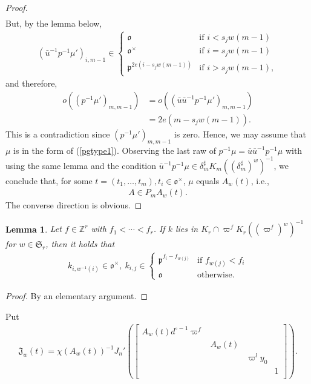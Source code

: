 \documentclass[11pt]{amsart}
\newcommand\Vp{\varpi}%
\newcommand\vp{\varphi}%
\newcommand\oo{\mathfrak{o}}
\newcommand\Sf{{\mathfrak{S}}}
\newcommand\Jf{\mathfrak{J}}
\newcommand\p{{\mathfrak{p}}}
\newcommand\Z{{\mathbb{Z}}}
\newcommand\1{\mathbf{1}}
\newcommand\nid{\noindent}
\newcommand\tm{\times}
\newcommand\bu{\bar{u}}
\numberwithin{equation}{section}
\newtheorem{lem}[thm]{Lemma}
\begin{document}
\begin{proof}
\begin{align*}
\end{align*}
But, by the lemma below, 
\begin{align*}
(\bu^{-1}  p^{-1} \mu')_{i,m-1} 
\in \begin{cases}
\oo & \mbox{if $i < s_jw(m-1)$} \\
\oo^\tm  & \mbox{if $i = s_jw(m-1)$} \\
\p^{2e(i- s_jw(m-1))} & \mbox{if $i > s_jw(m-1)$},
\end{cases}
\end{align*} 
and therefore, 
\begin{align*}
o((p^{-1} \mu')_{m,m-1}) &= o((\bu \bu^{-1} p^{-1} \mu')_{m, m-1})\\
 &= 2e(m- s_j w(m-1)).
\end{align*}
This is a contradiction since $(p^{-1} \mu')_{m,m-1}$ is zero.
Hence, we may assume that $\mu$ is in the form of (\ref{pgtype1}).
Observing the last raw of $p^{-1} \mu = \bu \bu^{-1} p^{-1} \mu$ with using the same lemma and the condition $\bu^{-1} p^{-1} \mu \in \delta_m^\sharp K_m ((\delta_m^\sharp)^{w})^{-1}$, we conclude that, for some $t = (t_1, \ldots, t_m), t_i \in \oo^\tm$, $\mu$ equals $A_w(t)$, i.e., 
\begin{align*}
 A \in P_mA_w(t).
 \end{align*}
The converse direction is obvious. 
\end{proof}
\begin{lem}
Let $f \in \Z^r$ with $f_1 < \cdots < f_r$.
If $k$ lies in $K_r \cap \Vp^f K_r ((\Vp^f)^w)^{-1}$ for $w \in \Sf_r$, then it holds that
\begin{align*}
k_{i,w^{-1}(i)} \in \oo^\tm, \ 
k_{i,j} \in \begin{cases}
\p^{f_i - f_{w(j)}} & \mbox{if $f_{w(j)} < f_i$} \\
\oo & \mbox{otherwise}. 
\end{cases}
\end{align*}
\end{lem}
\begin{proof}
By an elementary argument.
\end{proof}
\nid
Put
\begin{align*}
\Jf_{w}(t) = \chi(A_w(t))^{-1}J_n'(\begin{bmatrix}
A_{w}(t) d_{}^{\circ -1}\Vp^f & & &  \\
&A_{w}(t) & & \\
& &  \Vp^l y_{0} &  \\
& & &1  \\
\end{bmatrix}).
\end{align*} 
\end{document}
